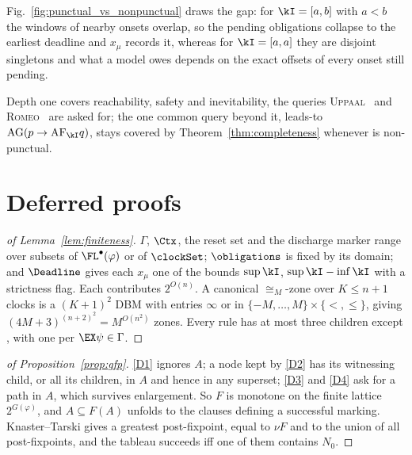 \noindent
Fig.~\ref{fig:punctual_vs_nonpunctual} draws the gap: for $\kI=[a,b]$ with $a<b$ the windows of
nearby onsets overlap, so the pending obligations collapse to the earliest deadline and $x_\mu$
records it, whereas for $\kI=[a,a]$ they are disjoint singletons and what a model owes depends on the
exact offsets of every onset still pending.

\noindent
Depth one covers reachability, safety and inevitability, the queries
\textsc{Uppaal}~\cite{BehrmannLarsenYi2004Uppaal} and \textsc{Romeo}~\cite{lime-TACAS-09} are asked
for; the one common query beyond it, leads-to $\mathrm{AG}(p\rightarrow\mathrm{AF}_\kI q)$, stays
covered by Theorem~\ref{thm:completeness} whenever \kI is non-punctual.


\iffalse
\section{Deferred proofs}\label{app:proofs}

\begin{proof}[of Lemma~\ref{lem:finiteness}]
$\Gamma$, $\Ctx$, the reset set and the discharge marker range over subsets of
$\FL^{\bullet}(\varphi)$ or of $\clockSet$; $\obligations$ is fixed by its domain; and $\Deadline$ gives each
$x_\mu$ one of the bounds $\sup\kI$, $\sup\kI-\inf\kI$ with a strictness flag. Each contributes
$2^{O(n)}$. A canonical $\cong_M$-zone over $K\le n+1$ clocks is a $(K{+}1)^{2}$ DBM with entries
$\infty$ or in $\{-M,\dots,M\}\times\{<,\le\}$, giving $(4M{+}3)^{(n+2)^{2}}=M^{O(n^{2})}$ zones.
Every rule has at most three children except , with one per $\EX\psi\in\Gamma$.
\end{proof}

\begin{proof}[of Proposition~\ref{prop:gfp}]
\ref{D1} ignores $A$; a node kept by \ref{D2} has its witnessing child, or all its children, in $A$
and hence in any superset; \ref{D3} and \ref{D4} ask for a path in $A$, which survives enlargement.
So $F$ is monotone on the finite lattice $2^{G(\varphi)}$, and $A\subseteq F(A)$ unfolds to the
clauses defining a successful marking. Knaster--Tarski gives a greatest post-fixpoint, equal to $\nu
F$ and to the union of all post-fixpoints, and the tableau succeeds iff one of them contains $N_0$.
\end{proof}

